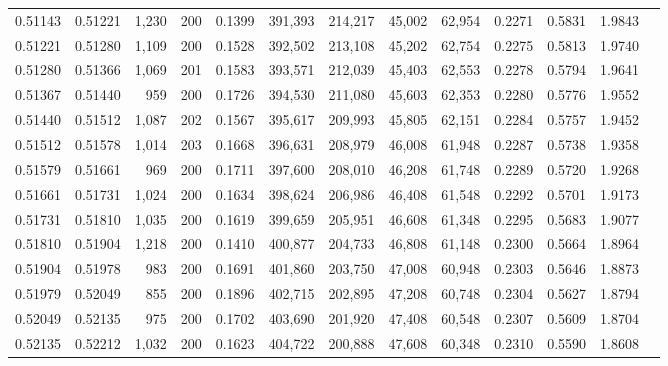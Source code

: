 \begin{tabular}{rrrrrrrrrrrrr}
0.51143 & 0.51221 & 1,230 & 200 &                                     0.1399 & 391,393 & 214,217 &  45,002 &  62,954 & 0.2271 & 0.5831 & 1.9843 \\
0.51221 & 0.51280 & 1,109 & 200 &                                     0.1528 & 392,502 & 213,108 &  45,202 &  62,754 & 0.2275 & 0.5813 & 1.9740 \\
0.51280 & 0.51366 & 1,069 & 201 &                                     0.1583 & 393,571 & 212,039 &  45,403 &  62,553 & 0.2278 & 0.5794 & 1.9641 \\
0.51367 & 0.51440 &   959 & 200 &                                     0.1726 & 394,530 & 211,080 &  45,603 &  62,353 & 0.2280 & 0.5776 & 1.9552 \\
0.51440 & 0.51512 & 1,087 & 202 &                                     0.1567 & 395,617 & 209,993 &  45,805 &  62,151 & 0.2284 & 0.5757 & 1.9452 \\
0.51512 & 0.51578 & 1,014 & 203 &                                     0.1668 & 396,631 & 208,979 &  46,008 &  61,948 & 0.2287 & 0.5738 & 1.9358 \\
0.51579 & 0.51661 &   969 & 200 &                                     0.1711 & 397,600 & 208,010 &  46,208 &  61,748 & 0.2289 & 0.5720 & 1.9268 \\
0.51661 & 0.51731 & 1,024 & 200 &                                     0.1634 & 398,624 & 206,986 &  46,408 &  61,548 & 0.2292 & 0.5701 & 1.9173 \\
0.51731 & 0.51810 & 1,035 & 200 &                                     0.1619 & 399,659 & 205,951 &  46,608 &  61,348 & 0.2295 & 0.5683 & 1.9077 \\
0.51810 & 0.51904 & 1,218 & 200 &                                     0.1410 & 400,877 & 204,733 &  46,808 &  61,148 & 0.2300 & 0.5664 & 1.8964 \\
0.51904 & 0.51978 &   983 & 200 &                                     0.1691 & 401,860 & 203,750 &  47,008 &  60,948 & 0.2303 & 0.5646 & 1.8873 \\
0.51979 & 0.52049 &   855 & 200 &                                     0.1896 & 402,715 & 202,895 &  47,208 &  60,748 & 0.2304 & 0.5627 & 1.8794 \\
0.52049 & 0.52135 &   975 & 200 &                                     0.1702 & 403,690 & 201,920 &  47,408 &  60,548 & 0.2307 & 0.5609 & 1.8704 \\
0.52135 & 0.52212 & 1,032 & 200 &                                     0.1623 & 404,722 & 200,888 &  47,608 &  60,348 & 0.2310 & 0.5590 & 1.8608 \\

\end{tabular}
